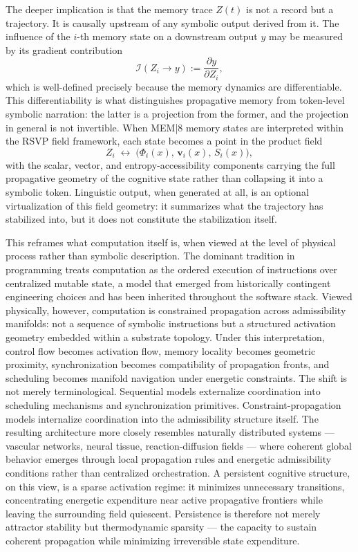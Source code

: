 \documentclass[12pt,a4paper]{article}
\begin{document}
The deeper implication is that the memory trace \(Z(t)\) is not a record but a trajectory. It is causally upstream of any symbolic output derived from it. The influence of the \(i\)-th memory state on a downstream output \(y\) may be measured by its gradient contribution
\[
\mathcal{I}(Z_i \to y) := \frac{\partial y}{\partial Z_i},
\]
which is well-defined precisely because the memory dynamics are differentiable. This differentiability is what distinguishes propagative memory from token-level symbolic narration: the latter is a projection from the former, and the projection in general is not invertible. When MEM|8 memory states are interpreted within the RSVP field framework, each state becomes a point in the product field
\[
Z_i \;\leftrightarrow\; \bigl(\Phi_i(x),\, \mathbf{v}_i(x),\, S_i(x)\bigr),
\]
with the scalar, vector, and entropy-accessibility components carrying the full propagative geometry of the cognitive state rather than collapsing it into a symbolic token. Linguistic output, when generated at all, is an optional virtualization of this field geometry: it summarizes what the trajectory has stabilized into, but it does not constitute the stabilization itself.

This reframes what computation itself is, when viewed at the level of physical process rather than symbolic description. The dominant tradition in programming treats computation as the ordered execution of instructions over centralized mutable state, a model that emerged from historically contingent engineering choices and has been inherited throughout the software stack. Viewed physically, however, computation is constrained propagation across admissibility manifolds: not a sequence of symbolic instructions but a structured activation geometry embedded within a substrate topology. Under this interpretation, control flow becomes activation flow, memory locality becomes geometric proximity, synchronization becomes compatibility of propagation fronts, and scheduling becomes manifold navigation under energetic constraints. The shift is not merely terminological. Sequential models externalize coordination into scheduling mechanisms and synchronization primitives. Constraint-propagation models internalize coordination into the admissibility structure itself. The resulting architecture more closely resembles naturally distributed systems — vascular networks, neural tissue, reaction-diffusion fields — where coherent global behavior emerges through local propagation rules and energetic admissibility conditions rather than centralized orchestration. A persistent cognitive structure, on this view, is a sparse activation regime: it minimizes unnecessary transitions, concentrating energetic expenditure near active propagative frontiers while leaving the surrounding field quiescent. Persistence is therefore not merely attractor stability but thermodynamic sparsity — the capacity to sustain coherent propagation while minimizing irreversible state expenditure.
\end{document}

